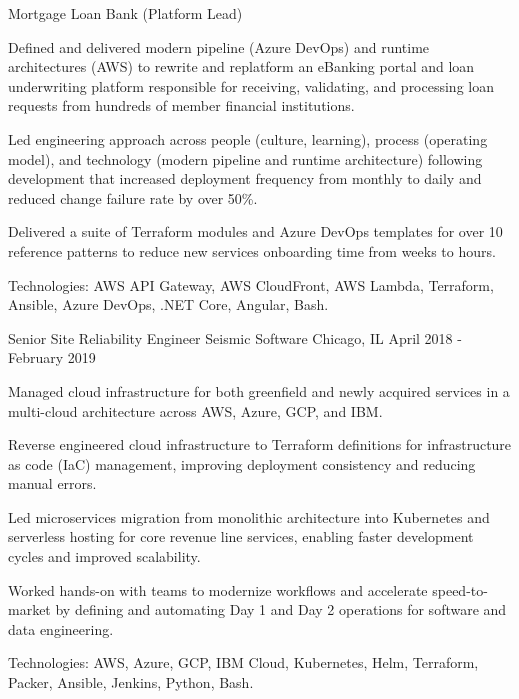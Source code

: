 \begin{cventries}
  \cventry
    {Mortgage Loan Bank (Platform Lead)} %
    {} %
    {} %
    {} %
    {
      \begin{cvitems} %
        \item {Defined and delivered modern pipeline (Azure DevOps) and runtime architectures (AWS) to rewrite and replatform an eBanking portal and loan underwriting platform responsible for receiving, validating, and processing loan requests from hundreds of member financial institutions.}
        \item {Led engineering approach across people (culture, learning), process (operating model), and technology (modern pipeline and runtime architecture) following development that increased deployment frequency from monthly to daily and reduced change failure rate by over 50\%.}
        \item {Delivered a suite of Terraform modules and Azure DevOps templates for over 10 reference patterns to reduce new services onboarding time from weeks to hours.}
        \item {Technologies: AWS API Gateway, AWS CloudFront, AWS Lambda, Terraform, Ansible, Azure DevOps, .NET Core, Angular, Bash.}
      \end{cvitems}
    }

  \cventry
    {Senior Site Reliability Engineer} %
    {Seismic Software} %
    {Chicago, IL} %
    {April 2018 - February 2019} %
    {
      \begin{cvitems} %
        \item {Managed cloud infrastructure for both greenfield and newly acquired services in a multi-cloud architecture across AWS, Azure, GCP, and IBM.}
        \item {Reverse engineered cloud infrastructure to Terraform definitions for infrastructure as code (IaC) management, improving deployment consistency and reducing manual errors.}
        \item {Led microservices migration from monolithic architecture into Kubernetes and serverless hosting for core revenue line services, enabling faster development cycles and improved scalability.}
        \item {Worked hands-on with teams to modernize workflows and accelerate speed-to-market by defining and automating Day 1 and Day 2 operations for software and data engineering.}
        \item {Technologies: AWS, Azure, GCP, IBM Cloud, Kubernetes, Helm, Terraform, Packer, Ansible, Jenkins, Python, Bash.}
      \end{cvitems}
    }


\end{cventries}
